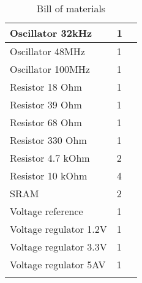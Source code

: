 \begin{longtable}{| p{5cm} | p{2cm} | p{2cm} |}
	Oscillator 32kHz & 1 &\\ \hline
	Oscillator 48MHz & 1 &\\ \hline
	Oscillator 100MHz & 1 &\\ \hline
	Resistor 18 Ohm & 1 &\\ \hline
	Resistor 39 Ohm & 1 &\\ \hline
	Resistor 68 Ohm & 1 &\\ \hline
	Resistor 330 Ohm & 1 &\\ \hline
	Resistor 4.7 kOhm & 2 &\\ \hline
	Resistor 10 kOhm & 4 &\\ \hline
	SRAM & 2 &\\ \hline
	Voltage reference & 1 &\\ \hline
	Voltage regulator 1.2V & 1 &\\ \hline
	Voltage regulator 3.3V & 1 &\\ \hline
	Voltage regulator 5AV & 1 &\\
	\hline
	\caption{Bill of materials}
	\label{tab:bom}
\end{longtable}